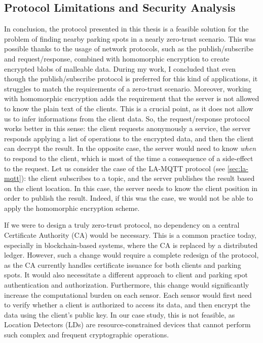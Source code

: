 \subsection{Protocol Limitations and Security Analysis}

In conclusion, the protocol presented in this thesis is a feasible solution for the problem of finding nearby parking spots in a nearly zero-trust scenario. This was possible thanks to the usage of network protocols, such as the publish/subscribe and request/response, combined with homomorphic encryption to create encrypted blobs of malleable data. 
During my work, I concluded that even though the publish/subscribe protocol is preferred for this kind of applications, it struggles to match the requirements of a zero-trust scenario. Moreover, working with homomorphic encryption adds the requirement that the server is not allowed to know the plain text of the clients. This is a crucial point, as it does not allow us to infer informations from the client data. So, the request/response protocol works better in this sense: the client requests anonymously a service, the server responds applying a list of operations to the encrypted data, and then the client can decrypt the result. In the opposite case, the server would need to know \emph{when} to respond to the client, which is most of the time a consequence of a side-effect to the request. Let us consider the case of the LA-MQTT protocol (see \cref{sec:la-mqtt}): the client subscribes to a topic, and the server publishes the result based on the client location. In this case, the server needs to know the client position in order to publish the result. Indeed, if this was the case, we would not be able to apply the homomorphic encryption scheme.

If we were to design a truly zero-trust protocol, no dependency on a central Certificate Authority (CA) would be necessary. This is a common practice today, especially in blockchain-based systems, where the CA is replaced by a distributed ledger. However, such a change would require a complete redesign of the protocol, as the CA currently handles certificate issuance for both clients and parking spots. It would also necessitate a different approach to client and parking spot authentication and authorization.
Furthermore, this change would significantly increase the computational burden on each sensor. Each sensor would first need to verify whether a client is authorized to access its data, and then encrypt the data using the client’s public key. In our case study, this is not feasible, as Location Detectors (LDs) are resource-constrained devices that cannot perform such complex and frequent cryptographic operations.

